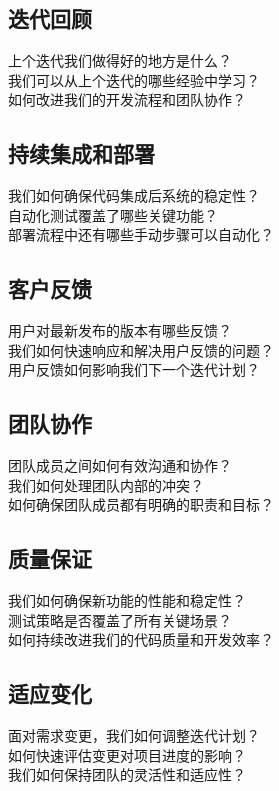 \documentclass[12pt]{book}
\begin{document}
\subsection{迭代回顾}
上个迭代我们做得好的地方是什么？\\
我们可以从上个迭代的哪些经验中学习？\\
如何改进我们的开发流程和团队协作？\\

\subsection{持续集成和部署}
我们如何确保代码集成后系统的稳定性？\\
自动化测试覆盖了哪些关键功能？\\
部署流程中还有哪些手动步骤可以自动化？\\

\subsection{客户反馈}
用户对最新发布的版本有哪些反馈？\\
我们如何快速响应和解决用户反馈的问题？\\
用户反馈如何影响我们下一个迭代计划？\\

\subsection{团队协作}
团队成员之间如何有效沟通和协作？\\
我们如何处理团队内部的冲突？\\
如何确保团队成员都有明确的职责和目标？\\

\subsection{质量保证}
我们如何确保新功能的性能和稳定性？\\
测试策略是否覆盖了所有关键场景？\\
如何持续改进我们的代码质量和开发效率？\\

\subsection{适应变化}
面对需求变更，我们如何调整迭代计划？\\
如何快速评估变更对项目进度的影响？\\
我们如何保持团队的灵活性和适应性？\\
\end{document}
